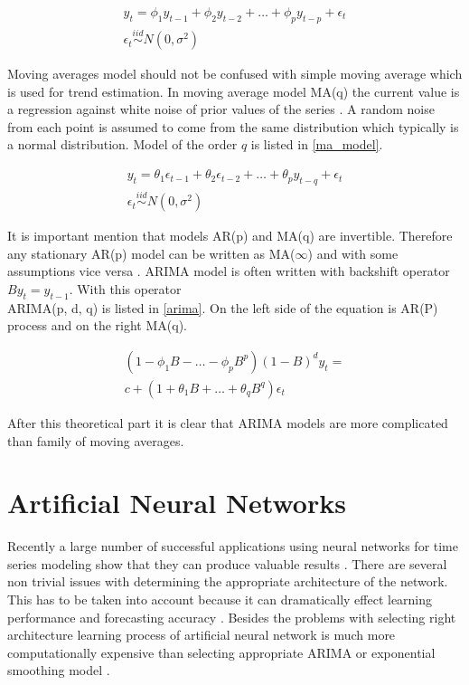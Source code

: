     \begin{gather} \label{ar_model}
        y_t = \phi_1 y_{t-1} + \phi_2 y_{t-2} + \dots + \phi_p y_{t-p} + \epsilon_t \\ \nonumber
        \epsilon_t \overset{iid}{\sim} N(0, \sigma^2)
    \end{gather}

    Moving averages model should not be confused with simple moving average which is
    used for trend estimation. In moving average model MA(q) the current value is
    a regression against white noise of prior values of the series \cite{wiki-ma-model}. A random noise from
    each point is assumed to come from the same distribution which typically is 
    a normal distribution. Model of the order $q$ is listed in \ref{ma_model}.

    \begin{gather} \label{ma_model}
        y_t = \theta_1 \epsilon_{t-1} + \theta_2 \epsilon_{t-2} + \dots + \theta_p y_{t-q} + \epsilon_t \\ \nonumber
        \epsilon_t \overset{iid}{\sim} N(0, \sigma^2)
    \end{gather}

    It is important mention that models AR(p) and MA(q) are invertible.
    Therefore any stationary AR(p) model can be written as MA($\infty$) and with some assumptions
    vice versa \cite{brockwell}. ARIMA model is often written with backshift operator $By_t=y_{t-1}$.
    With this operator \\ARIMA(p, d, q) is listed in \ref{arima}. On the left side of the equation is AR(P) process
    and on the right MA(q).

    \begin{gather} \label{arima}
        (1- \phi_1B - \dots - \phi_pB^p)(1-B)^d y_t = \\ \nonumber
         c + (1+\theta_1B+\dots+\theta_qB^q) \epsilon_t
    \end{gather}

    After this theoretical part it is clear that ARIMA models are more complicated than family of moving averages.
\newpage
    \section{Artificial Neural Networks}
    Recently a large number of successful applications using neural networks for time series modeling show that they
    can produce valuable results \cite{ann-forecasting-state-art}. There are several non trivial issues with
    determining the appropriate architecture of the network. This has to be taken into account because it can
    dramatically effect learning performance and forecasting accuracy \cite{ann-model-selecting}.
    Besides the problems with selecting right architecture learning process of artificial neural network is much more
    computationally expensive than selecting appropriate ARIMA or exponential smoothing model \cite{ann-forecasting}.


